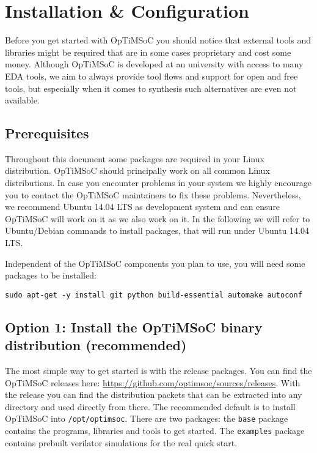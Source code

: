 \chapter{Installation \& Configuration}
\label{chap:installation}

Before you get started with OpTiMSoC you should notice that external
tools and libraries might be required that are in some cases
proprietary and cost some money. Although OpTiMSoC is developed at an
university with access to many EDA tools, we aim to always provide
tool flows and support for open and free tools, but especially when it
comes to synthesis such alternatives are even not available.

\section{Prerequisites}

Throughout this document some packages are required in your Linux
distribution. OpTiMSoC should principally work on all common Linux
distributions. In case you encounter problems in your system we highly
encourage you to contact the OpTiMSoC maintainers to fix these
problems. Nevertheless, we recommend Ubuntu 14.04 LTS as development
system and can ensure OpTiMSoC will work on it as we also work on
it. In the following we will refer to Ubuntu/Debian commands to
install packages, that will run under Ubuntu 14.04 LTS.

Independent of the OpTiMSoC components you plan to use, you will need some
packages to be installed:

\begin{lstlisting}
sudo apt-get -y install git python build-essential automake autoconf
\end{lstlisting}

\section{Option 1: Install the OpTiMSoC binary distribution (recommended)}

The most simple way to get started is with the release packages. You
can find the OpTiMSoC releases here:
\url{https://github.com/optimsoc/sources/releases}. With the release
you can find the distribution packets that can be extracted into any
directory and used directly from there. The recommended default is to
install OpTiMSoC into \verb|/opt/optimsoc|. There are two packages:
the \verb|base| package contains the programs, libraries and tools
to get started. The \verb|examples| package contains prebuilt verilator
simulations for the real quick start.

